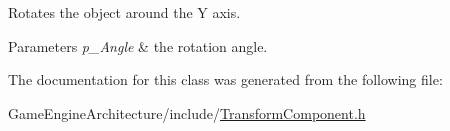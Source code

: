 Rotates the object around the Y axis. 


\begin{DoxyParams}{Parameters}
{\em p\+\_\+\+Angle} & the rotation angle. \\
\hline
\end{DoxyParams}


The documentation for this class was generated from the following file\+:\begin{DoxyCompactItemize}
\item 
Game\+Engine\+Architecture/include/\mbox{\hyperlink{_transform_component_8h}{Transform\+Component.\+h}}\end{DoxyCompactItemize}
